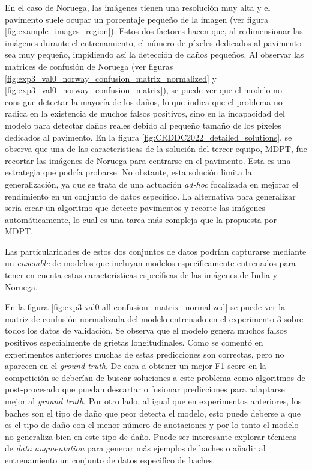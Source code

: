 En el caso de Noruega, las imágenes tienen una resolución muy alta y el pavimento suele ocupar un porcentaje pequeño de la imagen (ver figura \ref{fig:example_images_region}). Estos dos factores hacen que, al redimensionar las imágenes durante el entrenamiento, el número de píxeles dedicados al pavimento sea muy pequeño, impidiendo así la detección de daños pequeños. Al observar las matrices de confusión de Noruega (ver figuras \ref{fig:exp3_val0_norway_confusion_matrix_normalized} y \ref{fig:exp3_val0_norway_confusion_matrix}), se puede ver que el modelo no consigue detectar la mayoría de los daños, lo que indica que el problema no radica en la existencia de muchos falsos positivos, sino en la incapacidad del modelo para detectar daños reales debido al pequeño tamaño de los píxeles dedicados al pavimento. En la figura \ref{fig:CRDDC2022_detailed_solutions}, se observa que una de las características de la solución del tercer equipo, MDPT, fue recortar las imágenes de Noruega para centrarse en el pavimento. Esta es una estrategia que podría probarse. No obstante, esta solución limita la generalización, ya que se trata de una actuación \textit{ad-hoc} focalizada en mejorar el rendimiento en un conjunto de datos específico. La alternativa para generalizar sería crear un algoritmo que detecte pavimentos y recorte las imágenes automáticamente, lo cual es una tarea más compleja que la propuesta por MDPT.

Las particularidades de estos dos conjuntos de datos podrían capturarse mediante un \textit{ensemble} de modelos que incluyan modelos específicamente entrenados para tener en cuenta estas características específicas de las imágenes de India y Noruega.

En la figura \ref{fig:exp3-val0-all-confusion_matrix_normalized} se puede ver la matriz de confusión normalizada del modelo entrenado en el experimento 3 sobre todos los datos de validación. Se observa que el modelo genera muchos falsos positivos especialmente de grietas longitudinales. Como se comentó en experimentos anteriores muchas de estas predicciones son correctas, pero no aparecen en el \textit{ground truth}. De cara a obtener un mejor F1-score en la competición se deberían de buscar soluciones a este problema como algoritmos de post-procesado que puedan descartar o fusionar predicciones para adaptarse mejor al \textit{ground truth}. Por otro lado, al igual que en experimentos anteriores, los baches son el tipo de daño que peor detecta el modelo, esto puede deberse a que es el tipo de daño con el menor número de anotaciones y por lo tanto el modelo no generaliza bien en este tipo de daño. Puede ser interesante explorar técnicas de \textit{data augmentation} para generar más ejemplos de baches o añadir al entrenamiento un conjunto de datos especifico de baches.

